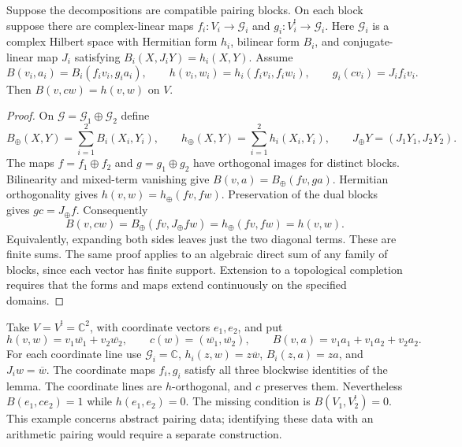\begin{lemma}
\label{v4-arith:w5-c:lem:block-pairing-transfer}
Suppose the decompositions are compatible pairing blocks.
On each block suppose there are complex-linear maps
$f_i:V_i\to\mathscr G_i$ and $g_i:V_i^!\to\mathscr G_i$.
Here $\mathscr G_i$ is a complex Hilbert space with Hermitian form
$h_i$, bilinear form $B_i$, and conjugate-linear map $J_i$ satisfying
$B_i(X,J_iY)=h_i(X,Y)$. Assume
\[
 B(v_i,a_i)=B_i(f_iv_i,g_ia_i),\qquad
 h(v_i,w_i)=h_i(f_iv_i,f_iw_i),\qquad
 g_i(c v_i)=J_i f_iv_i.
\]
Then $B(v,cw)=h(v,w)$ on $V$.
\end{lemma}
\begin{proof}
On $\mathscr G=\mathscr G_1\oplus\mathscr G_2$ define
\[
 B_{\oplus}(X,Y)=\sum_{i=1}^2B_i(X_i,Y_i),\qquad
 h_{\oplus}(X,Y)=\sum_{i=1}^2h_i(X_i,Y_i),\qquad
 J_{\oplus}Y=(J_1Y_1,J_2Y_2).
\]
The maps $f=f_1\oplus f_2$ and $g=g_1\oplus g_2$ have orthogonal
images for distinct blocks. Bilinearity and mixed-term vanishing give
$B(v,a)=B_{\oplus}(fv,ga)$. Hermitian orthogonality gives
$h(v,w)=h_{\oplus}(fv,fw)$. Preservation of the dual blocks gives
$gc=J_{\oplus}f$. Consequently
\[
 B(v,cw)=B_{\oplus}(fv,J_{\oplus}fw)=h_{\oplus}(fv,fw)=h(v,w).
\]
Equivalently, expanding both sides leaves just the two diagonal
terms. These are finite sums. The same proof applies to an
algebraic direct sum of any family of blocks, since each vector
has finite support. Extension to a topological completion requires
that the forms and maps extend continuously on the specified domains.
\end{proof}

\begin{example}
\label{v4-arith:w5-c:ex:mixed-pairing-obstruction}
Take $V=V^!=\mathbb C^2$, with coordinate vectors $e_1,e_2$, and put
\[
 h(v,w)=v_1\overline{w_1}+v_2\overline{w_2},\qquad
 c(w)=(\overline{w_1},\overline{w_2}),\qquad
 B(v,a)=v_1a_1+v_1a_2+v_2a_2.
\]
For each coordinate line use $\mathscr G_i=\mathbb C$,
$h_i(z,w)=z\overline w$, $B_i(z,a)=za$, and $J_iw=\overline w$.
The coordinate maps $f_i,g_i$ satisfy all three blockwise identities
of the lemma. The coordinate lines are $h$-orthogonal, and $c$
preserves them. Nevertheless $B(e_1,ce_2)=1$ while $h(e_1,e_2)=0$.
The missing condition is $B(V_1,V_2^!)=0$. This example concerns
abstract pairing data; identifying these data with an arithmetic
pairing would require a separate construction.
\end{example}

